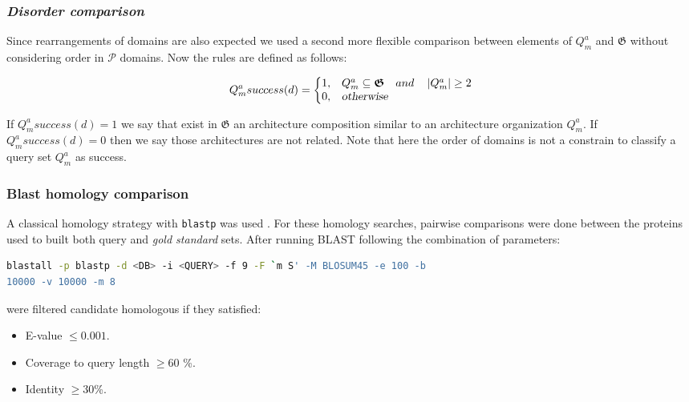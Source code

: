 \documentclass[11pt]{article}
\begin{document}
\subsubsection*{\textit{\textbf{D}isorder comparison}}
Since rearrangements of domains are also expected we used a second more 
flexible comparison between elements of $Q^{a}_{m}$ and 
$\boldsymbol{\mathfrak{G}}$ without considering order in $\mathcal{P}$ domains. 
Now the rules are defined as follows:

\begin{equation}
  Q^a_{m}{success(d)}=\left\{
  \begin{array}{@{}ll@{}}
    1, & Q^a_{m} \subseteq  \boldsymbol{\mathfrak{G}} \quad and \quad \left|Q^a_{m}\right| \geq 2 \\
    0, & \textsl{otherwise}
  \end{array}\right.
\end{equation}

If $Q^a_{m}{success(d)} = 1$ we say that exist in $\boldsymbol{\mathfrak{G}}$ 
an architecture composition similar to an architecture organization $Q^{a}_{m}$. 
If $Q^a_{m}{success(d)} = 0$ then we say those architectures are not related. 
Note that here the order of domains  is not a constrain to classify a query set 
$Q^a_{m}$ as success.

\subsubsection*{\textbf{B}last homology comparison}
A classical homology strategy with \texttt{blastp} was used \cite{Korf:2003}. 
For these homology searches, pairwise comparisons were done between the 
proteins used to built both query and \textsl{gold standard} sets. After running 
BLAST following the combination of parameters: 
\begin{lstlisting}[language=bash, breaklines=true]
blastall -p blastp -d <DB> -i <QUERY> -f 9 -F `m S' -M BLOSUM45 -e 100 -b 
10000 -v 10000 -m 8
\end{lstlisting}

were filtered candidate homologous if they satisfied:
\begin{itemize}
\item E-value $\leq 0.001$.
\item Coverage to query length $\geq 60$ \%.
\item Identity $\geq 30$\%.
\end{itemize}
\end{document}
